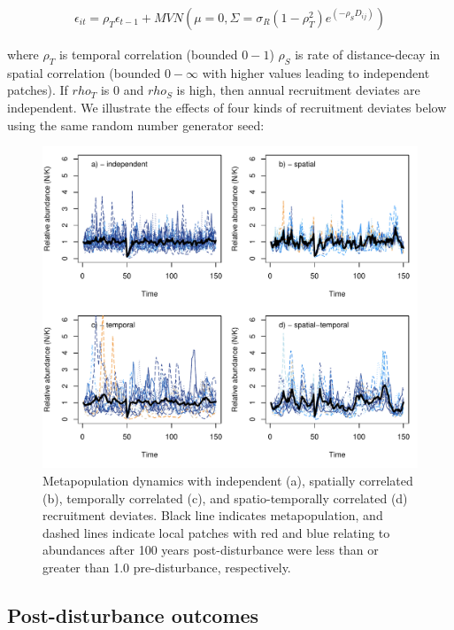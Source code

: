 \documentclass[
]{article}
\begin{document}
\begin{align}
\epsilon_{it}=\rho_T\epsilon_{t-1}+MVN(\mu=0,\Sigma=\sigma_R(1-\rho_T^2)e^{(-\rho_SD_{ij})})
\end{align}

where \(\rho_T\) is temporal correlation (bounded \(0-1\)) \(\rho_S\) is
rate of distance-decay in spatial correlation (bounded \(0-\infty\) with
higher values leading to independent patches). If \(rho_T\) is 0 and
\(rho_S\) is high, then annual recruitment deviates are independent. We
illustrate the effects of four kinds of recruitment deviates below using
the same random number generator seed:

\begin{figure}[H]

{\centering \includegraphics{Managing_for_ecological_surprises_in_metapopulations_files/figure-latex/independent stochasticity-1} 

}

\caption{Metapopulation dynamics with independent (a), spatially correlated (b), temporally correlated (c), and spatio-temporally correlated (d) recruitment deviates. Black line indicates metapopulation, and dashed lines indicate local patches with red and blue relating to abundances after 100 years post-disturbance were less than or greater than 1.0 pre-disturbance, respectively.}\label{fig:independent stochasticity}
\end{figure}

\hypertarget{post-disturbance-outcomes}{%
\subsection{Post-disturbance outcomes}\label{post-disturbance-outcomes}}
\end{document}
